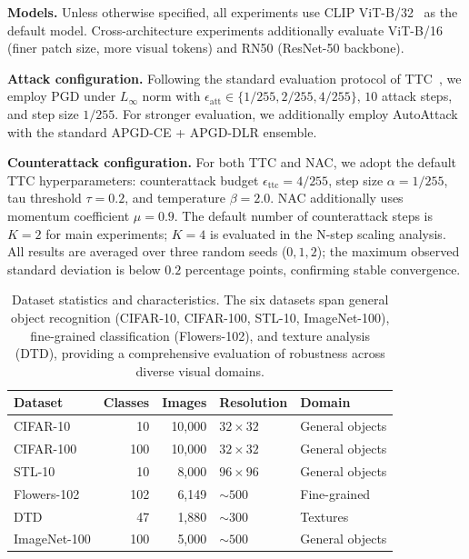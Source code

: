 \documentclass[12pt,a4paper]{article}
\begin{document}
\textbf{Models.} Unless otherwise specified, all experiments use CLIP ViT-B/32~\cite{radford2021clip} as the default model. Cross-architecture experiments additionally evaluate ViT-B/16 (finer patch size, more visual tokens) and RN50 (ResNet-50 backbone).

\textbf{Attack configuration.} Following the standard evaluation protocol of TTC~\cite{xing2025clip}, we employ PGD under $L_\infty$ norm with $\epsilon_{\text{att}} \in \{1/255, 2/255, 4/255\}$, $10$ attack steps, and step size $1/255$. For stronger evaluation, we additionally employ AutoAttack~\cite{croce2020reliable} with the standard APGD-CE + APGD-DLR ensemble.

\textbf{Counterattack configuration.} For both TTC and NAC, we adopt the default TTC hyperparameters: counterattack budget $\epsilon_{\text{ttc}} = 4/255$, step size $\alpha = 1/255$, tau threshold $\tau = 0.2$, and temperature $\beta = 2.0$. NAC additionally uses momentum coefficient $\mu = 0.9$. The default number of counterattack steps is $K=2$ for main experiments; $K=4$ is evaluated in the N-step scaling analysis. All results are averaged over three random seeds ($0, 1, 2$); the maximum observed standard deviation is below $0.2$ percentage points, confirming stable convergence.

\begin{table}[ht]\centering\small
\caption{Dataset statistics and characteristics. The six datasets span general object recognition (CIFAR-10, CIFAR-100, STL-10, ImageNet-100), fine-grained classification (Flowers-102), and texture analysis (DTD), providing a comprehensive evaluation of robustness across diverse visual domains.}\label{tab:datasets}
\begin{tabular}{@{}lrrll@{}}
\toprule Dataset & Classes & Images & Resolution & Domain \\
\midrule CIFAR-10 & 10 & 10,000 & $32\times32$ & General objects \\
CIFAR-100 & 100 & 10,000 & $32\times32$ & General objects \\
STL-10 & 10 & 8,000 & $96\times96$ & General objects \\
Flowers-102 & 102 & 6,149 & ${\sim}500$ & Fine-grained \\
DTD & 47 & 1,880 & ${\sim}300$ & Textures \\
ImageNet-100 & 100 & 5,000 & ${\sim}500$ & General objects \\
\bottomrule
\end{tabular}
\end{table}
\end{document}
